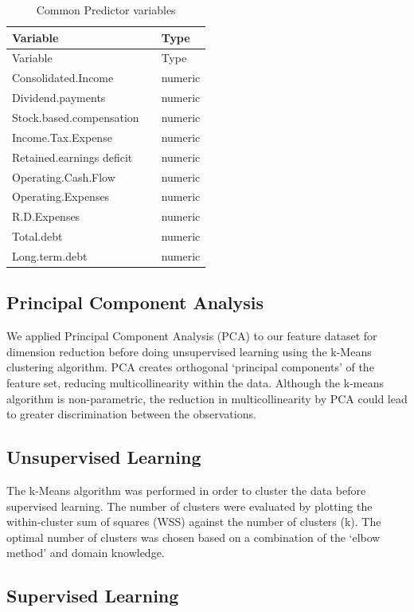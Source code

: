\documentclass[11pt,]{article}
\begin{document}
\begin{longtable}[]{@{}lll@{}}
\caption{Common Predictor variables}\tabularnewline
\toprule
Variable & & Type\tabularnewline
\midrule
\endfirsthead
\toprule
Variable & & Type\tabularnewline
\midrule
\endhead
Consolidated.Income & & numeric\tabularnewline
Dividend.payments & & numeric\tabularnewline
Stock.based.compensation & & numeric\tabularnewline
Income.Tax.Expense & & numeric\tabularnewline
Retained.earnings deficit & & numeric\tabularnewline
Operating.Cash.Flow & & numeric\tabularnewline
Operating.Expenses & & numeric\tabularnewline
R.D.Expenses & & numeric\tabularnewline
Total.debt & & numeric\tabularnewline
Long.term.debt & & numeric\tabularnewline
\bottomrule
\end{longtable}

\hypertarget{principal-component-analysis}{%
\subsection{Principal Component
Analysis}\label{principal-component-analysis}}

We applied Principal Component Analysis (PCA) to our feature dataset for
dimension reduction before doing unsupervised learning using the k-Means
clustering algorithm. PCA creates orthogonal `principal components' of
the feature set, reducing multicollinearity within the data. Although
the k-means algorithm is non-parametric, the reduction in
multicollinearity by PCA could lead to greater discrimination between
the observations.

\hypertarget{unsupervised-learning}{%
\subsection{Unsupervised Learning}\label{unsupervised-learning}}

The k-Means algorithm was performed in order to cluster the data before
supervised learning. The number of clusters were evaluated by plotting
the within-cluster sum of squares (WSS) against the number of clusters
(k). The optimal number of clusters was chosen based on a combination of
the `elbow method' and domain knowledge.

\hypertarget{supervised-learning}{%
\subsection{Supervised Learning}\label{supervised-learning}}
\end{document}

